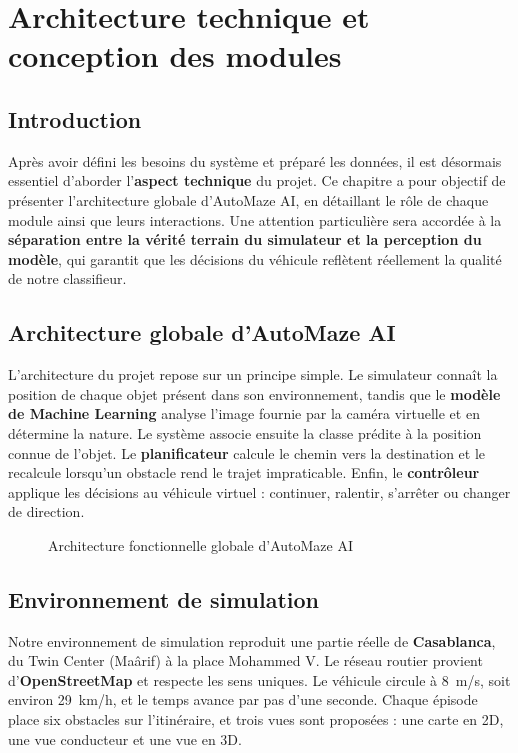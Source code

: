 \chapter{Architecture technique et conception des modules}
\label{chap:architecture}

\section{Introduction}

Après avoir défini les besoins du système et préparé les données, il est désormais essentiel d'aborder l'\textbf{aspect technique} du projet. Ce chapitre a pour objectif de présenter l'architecture globale d'AutoMaze AI, en détaillant le rôle de chaque module ainsi que leurs interactions. Une attention particulière sera accordée à la \textbf{séparation entre la vérité terrain du simulateur et la perception du modèle}, qui garantit que les décisions du véhicule reflètent réellement la qualité de notre classifieur.

\section{Architecture globale d'AutoMaze AI}

L'architecture du projet repose sur un principe simple. Le simulateur connaît la position de chaque objet présent dans son environnement, tandis que le \textbf{modèle de Machine Learning} analyse l'image fournie par la caméra virtuelle et en détermine la nature. Le système associe ensuite la classe prédite à la position connue de l'objet. Le \textbf{planificateur} calcule le chemin vers la destination et le recalcule lorsqu'un obstacle rend le trajet impraticable. Enfin, le \textbf{contrôleur} applique les décisions au véhicule virtuel : continuer, ralentir, s'arrêter ou changer de direction.

\begin{figure}[H]
  \centering
  \resizebox{\textwidth}{!}{}
  \caption{Architecture fonctionnelle globale d'AutoMaze AI}
  \label{fig:architecture}
\end{figure}

\section{Environnement de simulation}
\label{sec:environnement}

Notre environnement de simulation reproduit une partie réelle de \textbf{Casablanca}, du Twin Center (Maârif) à la place Mohammed V. Le réseau routier provient d'\textbf{OpenStreetMap} et respecte les sens uniques. Le véhicule circule à 8~m/s, soit environ 29~km/h, et le temps avance par pas d'une seconde. Chaque épisode place six obstacles sur l'itinéraire, et trois vues sont proposées : une carte en 2D, une vue conducteur et une vue en 3D.

